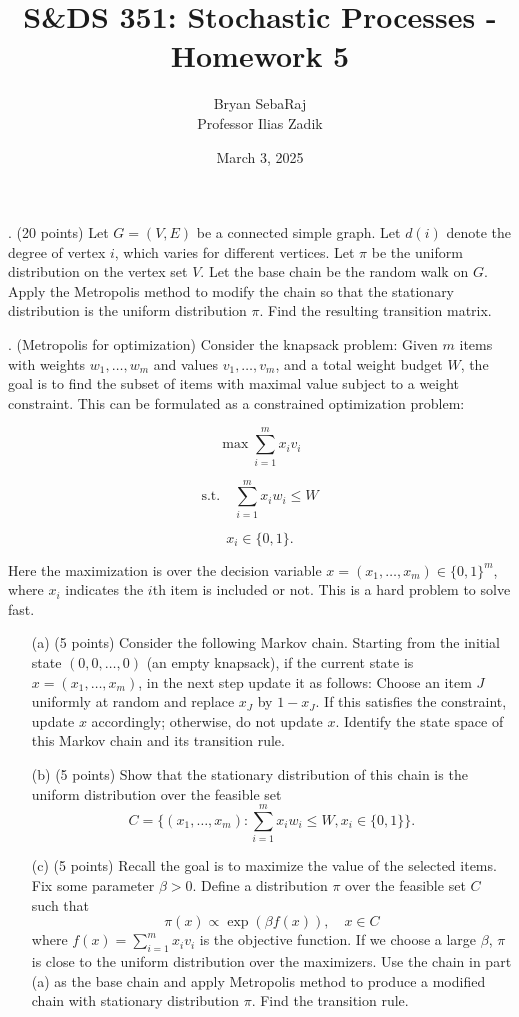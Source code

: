 \documentclass{article}
\title{S\&DS 351: Stochastic Processes - Homework 5}
\author{Bryan SebaRaj \\[0.8em] Professor Ilias Zadik}
\date{March 3, 2025}
\begin{document}
\maketitle

. (20 points) Let $G = (V, E)$ be a connected simple graph. Let $d(i)$ denote the degree of vertex $i$, which varies for different vertices. Let $\pi$ be the uniform distribution on the vertex set $V$. Let the base chain be the random walk on $G$. Apply the Metropolis method to modify the chain so that the stationary distribution is the uniform distribution $\pi$. Find the resulting transition matrix.

\bigskip

. (Metropolis for optimization) Consider the knapsack problem: Given $m$ items with weights $w_1, \dots, w_m$ and values $v_1, \dots, v_m$, and a total weight budget $W$, the goal is to find the subset of items with maximal value subject to a weight constraint. This can be formulated as a constrained optimization problem:

\[
\max \sum_{i=1}^{m} x_i v_i
\]

\[
\text{s.t.} \quad \sum_{i=1}^{m} x_i w_i \leq W
\]

\[
x_i \in \{0,1\}.
\]

Here the maximization is over the decision variable $x = (x_1, \dots, x_m) \in \{0,1\}^m$, where $x_i$ indicates the $i$th item is included or not. This is a hard problem to solve fast.

\begin{itemize}
    \item[(a)] (5 points) Consider the following Markov chain. Starting from the initial state $(0,0, \dots, 0)$ (an empty knapsack), if the current state is $x = (x_1, \dots, x_m)$, in the next step update it as follows: Choose an item $J$ uniformly at random and replace $x_J$ by $1 - x_J$. If this satisfies the constraint, update $x$ accordingly; otherwise, do not update $x$. Identify the state space of this Markov chain and its transition rule.
    
    \item[(b)] (5 points) Show that the stationary distribution of this chain is the uniform distribution over the feasible set 
    \[
    C = \{(x_1, \dots, x_m) : \sum_{i=1}^{m} x_i w_i \leq W, x_i \in \{0,1\}\}.
    \]
    
    \item[(c)] (5 points) Recall the goal is to maximize the value of the selected items. Fix some parameter $\beta > 0$. Define a distribution $\pi$ over the feasible set $C$ such that
    \[
    \pi(x) \propto \exp(\beta f(x)), \quad x \in C
    \]
    where $f(x) = \sum_{i=1}^{m} x_i v_i$ is the objective function. If we choose a large $\beta$, $\pi$ is close to the uniform distribution over the maximizers. Use the chain in part (a) as the base chain and apply Metropolis method to produce a modified chain with stationary distribution $\pi$. Find the transition rule.
\end{itemize}
\end{document}
